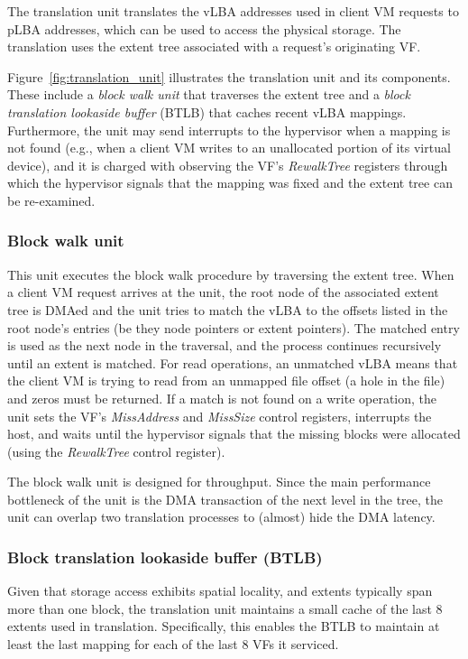 The translation unit translates the vLBA addresses used in client VM requests to pLBA addresses, which can be used to access the physical storage. The translation uses the extent tree associated with a request's originating VF.

Figure~\ref{fig:translation_unit} illustrates the translation unit and its components. These include a \emph{block walk unit} that traverses the extent tree and a \emph{block translation lookaside buffer} (BTLB) that caches recent vLBA mappings. Furthermore, the unit may send interrupts to the hypervisor when a mapping is not found (e.g., when a client VM writes to an unallocated portion of its virtual device), and it is charged with observing the VF's \emph{RewalkTree} registers through which the hypervisor signals that the mapping was fixed and the extent tree can be re-examined.

\subsubsection*{Block walk unit}
This unit executes the block walk procedure by traversing the extent tree.
When a client VM request arrives at the unit, the root node of the associated extent tree is DMAed and the unit tries to match the vLBA to the offsets listed in the root node's entries (be they node pointers or extent pointers). The matched entry is used as the next node in the traversal, and the process continues recursively until an extent is matched. For read operations, an unmatched vLBA means that the client VM is trying to read from an unmapped file offset (a hole in the file) and zeros must be returned. If a match is not found on a write operation, the unit sets the VF's \emph{MissAddress} and \emph{MissSize} control registers, interrupts the host, and waits until the hypervisor signals that the missing blocks were allocated (using the \emph{RewalkTree} control register).

The block walk unit is designed for throughput. Since the main performance bottleneck of the unit is the DMA transaction of the next level in the tree, the unit can overlap two translation processes to (almost) hide the DMA latency.

\subsubsection*{Block translation lookaside buffer (BTLB)}
Given that storage access exhibits spatial locality, and  extents typically span more than one block, the translation unit maintains a small cache of the last 8 extents used in translation. Specifically, this enables the BTLB to maintain at least the last mapping for each of the last 8 VFs it serviced.

